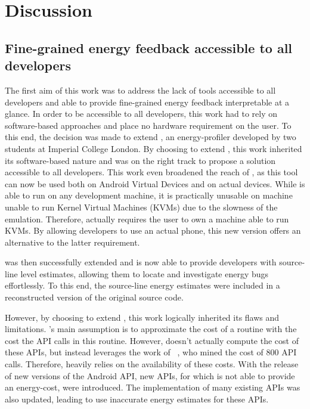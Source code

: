 \section{Discussion}
\subsection{Fine-grained energy feedback accessible to all developers}
The first aim of this work was to address the lack of tools accessible to all developers and able to provide fine-grained energy feedback interpretable at a glance.
In order to be accessible to all developers, this work had to rely on software-based approaches and place no hardware requirement on the user.
To this end, the decision was made to extend \orka{}, an energy-profiler developed by two students at Imperial College London.
By choosing to extend \orka{}, this work inherited its software-based nature and was on the right track to propose a solution accessible to all developers.
This work even broadened the reach of \orka{}, as this tool can now be used both on Android Virtual Devices and on actual devices.
While \orka{} is able to run on any development machine, it is practically unusable on machine unable to run Kernel Virtual Machines (KVMs) due to the slowness of the emulation.
Therefore, \orka{} actually requires the user to own a machine able to run KVMs.
By allowing developers to use an actual phone, this new version offers an alternative to the latter requirement.

\orka{} was then successfully extended and is now able to provide developers with source-line level estimates, allowing them to locate and investigate energy bugs effortlessly.
To this end, the source-line energy estimates were included in a reconstructed version of the original source code.

However, by choosing to extend \orka{}, this work logically inherited its flaws and limitations.
\orka{}'s main assumption is to approximate the cost of a routine with the cost the API calls in this routine.
However, \orka{} doesn't actually compute the cost of these APIs, but instead leverages the work of \lv{}\ , who mined the cost of 800 API calls.
Therefore, \orka{} heavily relies on the availability of these costs.
With the release of new versions of the Android API, new APIs, for which \orka{} is not able to provide an energy-cost,  were introduced.
The implementation of many existing APIs was also updated, leading \orka{} to use inaccurate energy estimates for these APIs.

